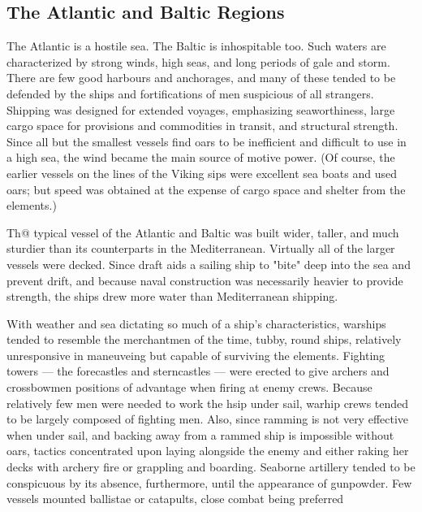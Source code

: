 \documentclass{article}
\begin{document}
\begin{multicols}{3}
  
\section{The Atlantic and Baltic Regions}

The Atlantic is a hostile sea.  The Baltic is inhospitable too.  Such
waters are characterized by strong winds, high seas, and long periods
of gale and storm.  There are few good harbours and anchorages, and
many of these tended to be defended by the ships and fortifications of
men suspicious of all strangers.  Shipping was designed for extended
voyages, emphasizing seaworthiness, large cargo space for provisions
and commodities in transit, and structural strength.  Since all but
the smallest vessels find oars to be inefficient and difficult to use
in a high sea, the wind became the main source of motive power. (Of
course, the earlier vessels on the lines of the Viking sips were
excellent sea boats and used oars; but speed was obtained at the
expense of cargo space and shelter from the elements.)

Th@ typical vessel of the Atlantic and Baltic was built wider, taller,
and much sturdier than its counterparts in the Mediterranean.
Virtually all of the larger vessels were decked.  Since draft aids a
sailing ship to "bite" deep into the sea and prevent drift, and
because naval construction was necessarily heavier to provide
strength, the ships drew more water than Mediterranean shipping.

With weather and sea dictating so much of a ship's characteristics,
warships tended to resemble the merchantmen of the time, tubby, round
ships, relatively unresponsive in maneuveing but capable of surviving
the elements.  Fighting towers --- the forecastles and sterncastles
--- were erected to give archers and crossbowmen positions of
advantage when firing at enemy crews.  Because relatively few men were
needed to work the hsip under sail, warhip crews tended to be largely
composed of fighting men.  Also, since ramming is not very effective
when under sail, and backing away from a rammed ship is impossible
without oars, tactics concentrated upon laying alongside the enemy and
either raking her decks with archery fire or grappling and boarding.
Seaborne artillery tended to be conspicuous by its absence,
furthermore, until the appearance of gunpowder.  Few vessels
mounted ballistae or catapults, close combat being preferred



\end{multicols}
\end{document}
